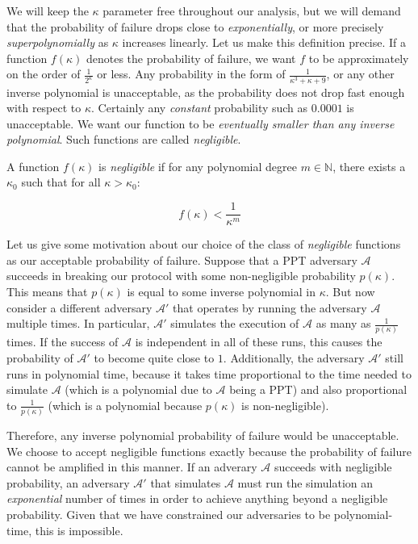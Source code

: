 We will keep the $\kappa$ parameter free throughout our analysis, but we will
demand that the probability of failure drops close to \emph{exponentially}, or more precisely
\emph{superpolynomially} as $\kappa$ increases linearly. Let us make this definition
precise. If a function $f(\kappa)$ denotes the probability of failure, we want $f$ to be
approximately on the order of $\frac{1}{2^\kappa}$ or less. Any probability in the form
of $\frac{1}{\kappa^3 + \kappa + 9}$, or any other inverse polynomial is unacceptable,
as the probability does not drop fast enough with respect to $\kappa$. Certainly any
\emph{constant} probability such as $0.0001$ is unacceptable. We want our function to
be \emph{eventually smaller than any inverse polynomial}. Such functions are called
\emph{negligible}.

\begin{definition}
  A function $f(\kappa)$ is \emph{negligible} if for any polynomial degree
  $m \in \mathbb{N}$, there exists a $\kappa_0$ such that for all
  $\kappa > \kappa_0$:

  \[
    f(\kappa) < \frac{1}{\kappa^m}
  \]
\end{definition}

Let us give some motivation about our choice of the class of \emph{negligible}
functions as our acceptable probability of failure. Suppose that a PPT adversary
$\mathcal{A}$ succeeds in breaking our protocol with some non-negligible probability
$p(\kappa)$. This means that $p(\kappa)$ is equal to some inverse polynomial in $\kappa$.
But now consider a different adversary $\mathcal{A}'$ that operates by running the
adversary $\mathcal{A}$ multiple times. In particular, $\mathcal{A}'$ simulates the
execution of $\mathcal{A}$ as many as $\frac{1}{p(\kappa)}$ times. If the success of
$\mathcal{A}$ is independent in all of these runs, this causes the probability of $\mathcal{A}'$
to become quite close to $1$. Additionally, the adversary $\mathcal{A}'$ still runs
in polynomial time, because it takes time proportional to the time needed to simulate
$\mathcal{A}$ (which is a polynomial due to $\mathcal{A}$ being a PPT) and also
proportional to $\frac{1}{p(\kappa)}$ (which is a polynomial because $p(\kappa)$
is non-negligible).

Therefore, any inverse polynomial probability of failure would be unacceptable.
We choose to accept negligible functions exactly because the probability of failure
cannot be amplified in this manner. If an adverary $\mathcal{A}$ succeeds with negligible
probability, an adversary $\mathcal{A}'$ that simulates $\mathcal{A}$ must run the
simulation an \emph{exponential} number of times in order to achieve anything beyond
a negligible probability. Given that we have constrained our adversaries to be polynomial-time,
this is impossible.

